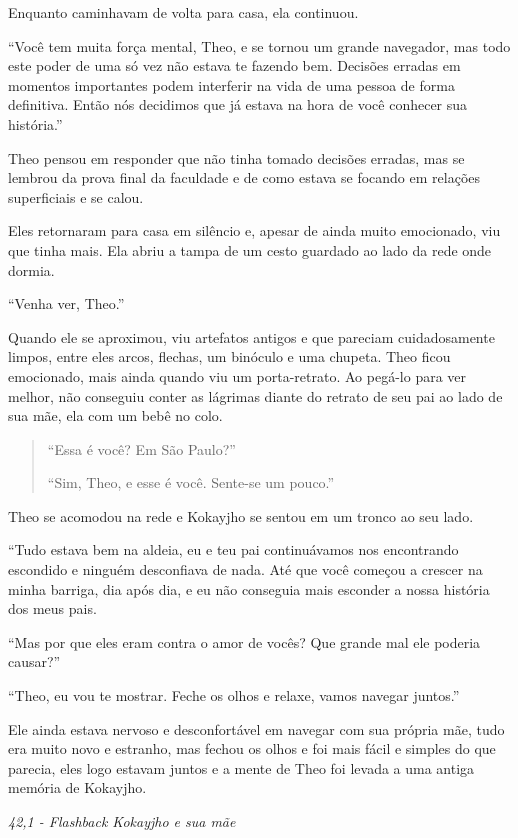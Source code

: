 Enquanto caminhavam de volta para casa, ela continuou.

``Você tem muita força mental, Theo, e se tornou um grande navegador,
mas todo este poder de uma só vez não estava te fazendo bem. Decisões
erradas em momentos importantes podem interferir na vida de uma pessoa
de forma definitiva. Então nós decidimos que já estava na hora de você
conhecer sua história.''

Theo pensou em responder que não tinha tomado decisões erradas, mas se
lembrou da prova final da faculdade e de como estava se focando em
relações superficiais e se calou.

Eles retornaram para casa em silêncio e, apesar de ainda muito
emocionado, viu que tinha mais. Ela abriu a tampa de um cesto guardado
ao lado da rede onde dormia.

``Venha ver, Theo.''

Quando ele se aproximou, viu artefatos antigos e que pareciam
cuidadosamente limpos, entre eles arcos, flechas, um binóculo e uma
chupeta. Theo ficou emocionado, mais ainda quando viu um porta-retrato.
Ao pegá-lo para ver melhor, não conseguiu conter as lágrimas diante do
retrato de seu pai ao lado de sua mãe, ela com um bebê no colo.

\begin{quote}
``Essa é você? Em São Paulo?''

``Sim, Theo, e esse é você. Sente-se um pouco.''
\end{quote}

Theo se acomodou na rede e Kokayjho se sentou em um tronco ao seu lado.

``Tudo estava bem na aldeia, eu e teu pai continuávamos nos encontrando
escondido e ninguém desconfiava de nada. Até que você começou a crescer
na minha barriga, dia após dia, e eu não conseguia mais esconder a nossa
história dos meus pais.

``Mas por que eles eram contra o amor de vocês? Que grande mal ele
poderia causar?''

``Theo, eu vou te mostrar. Feche os olhos e relaxe, vamos navegar
juntos.''

Ele ainda estava nervoso e desconfortável em navegar com sua própria
mãe, tudo era muito novo e estranho, mas fechou os olhos e foi mais
fácil e simples do que parecia, eles logo estavam juntos e a mente de
Theo foi levada a uma antiga memória de Kokayjho.

\asterisc

\emph{42,1 - Flashback Kokayjho e sua mãe}

